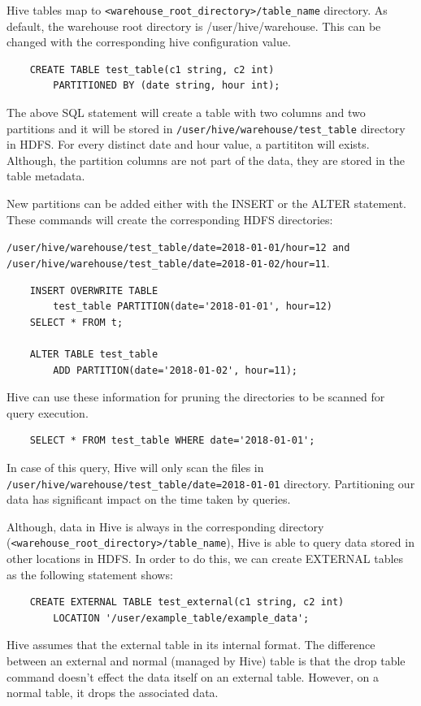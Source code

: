 Hive tables map to \texttt{<warehouse\_root\_directory>/table\_name} directory. As default, the warehouse root directory is /user/hive/warehouse. This can be changed with the corresponding hive configuration value.
\begin{lstlisting}
	CREATE TABLE test_table(c1 string, c2 int) 
		PARTITIONED BY (date string, hour int);
\end{lstlisting}

The above SQL statement will create a table with two columns and two partitions and it will be stored in  \texttt{/user/hive/warehouse/test\_table} directory in HDFS. For every distinct date and hour value, a partititon will exists. Although, the partition columns are not part of the data, they are stored in the table metadata. 

New partitions can be added either with the INSERT or the ALTER statement. These commands will create the corresponding HDFS directories: 

\texttt{/user/hive/warehouse/test\_table/date=2018-01-01/hour=12 and /user/hive/warehouse/test\_table/date=2018-01-02/hour=11}.

\begin{lstlisting}
	INSERT OVERWRITE TABLE
		test_table PARTITION(date='2018-01-01', hour=12)
	SELECT * FROM t;
	
	ALTER TABLE test_table
		ADD PARTITION(date='2018-01-02', hour=11);
\end{lstlisting}

Hive can use these information for pruning the directories to be scanned for query execution. 
\begin{lstlisting}
	SELECT * FROM test_table WHERE date='2018-01-01';
\end{lstlisting}
In case of this query, Hive will only scan the files in \texttt{/user/hive/warehouse/test\_table/date=2018-01-01} directory. Partitioning our data has significant impact on the time taken by queries.

Although, data in Hive is always in the corresponding directory (\texttt{<warehouse\_root\_directory>/table\_name}), Hive is able to query data stored in other locations in HDFS. In order to do this, we can create EXTERNAL tables as the following statement shows:
\begin{lstlisting}
	CREATE EXTERNAL TABLE test_external(c1 string, c2 int)
		LOCATION '/user/example_table/example_data';
\end{lstlisting}

Hive assumes that the external table in its internal format. The difference between an external and normal (managed by Hive) table is that the drop table command doesn't effect the data itself on an external table. However, on a normal table, it drops the associated data.

